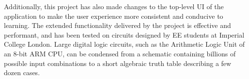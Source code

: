Additionally, this project has also made changes to the top-level UI of the application to make the user experience more consistent and conducive to learning.
The extended functionality delivered by the project is effective and performant, and has been tested on circuits designed by EE students at Imperial College London. Large digital logic circuits, such as the Arithmetic Logic Unit of an 8-bit ARM CPU, can be condensed from a schematic containing billions of possible input combinations to a short algebraic truth table describing a few dozen cases. 

\newpage

\tableofcontents